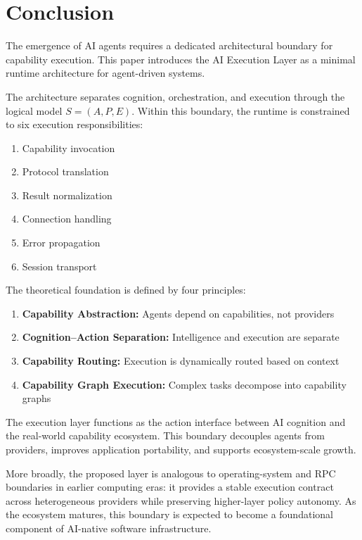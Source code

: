 \section{Conclusion}

The emergence of AI agents requires a dedicated architectural boundary for capability execution. This paper introduces the AI Execution Layer as a minimal runtime architecture for agent-driven systems.

The architecture separates cognition, orchestration, and execution through the logical model $S = (A, P, E)$. Within this boundary, the runtime is constrained to six execution responsibilities:
\begin{enumerate}
    \item Capability invocation
    \item Protocol translation
    \item Result normalization
    \item Connection handling
    \item Error propagation
    \item Session transport
\end{enumerate}

The theoretical foundation is defined by four principles:
\begin{enumerate}
    \item \textbf{Capability Abstraction:} Agents depend on capabilities, not providers
    \item \textbf{Cognition--Action Separation:} Intelligence and execution are separate
    \item \textbf{Capability Routing:} Execution is dynamically routed based on context
    \item \textbf{Capability Graph Execution:} Complex tasks decompose into capability graphs
\end{enumerate}

The execution layer functions as the action interface between AI cognition and the real-world capability ecosystem. This boundary decouples agents from providers, improves application portability, and supports ecosystem-scale growth.

More broadly, the proposed layer is analogous to operating-system and RPC boundaries in earlier computing eras: it provides a stable execution contract across heterogeneous providers while preserving higher-layer policy autonomy. As the ecosystem matures, this boundary is expected to become a foundational component of AI-native software infrastructure.

